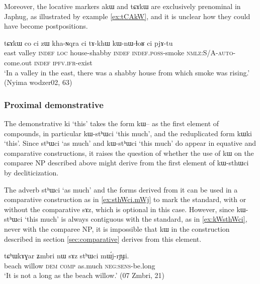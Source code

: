 \documentclass[oldfontcommands,oneside,a4paper,11pt]{article}
\newcommand{\ipa}[1]{{\phon #1}} %
\begin{document}
Moreover, the  locative markers \ipa{akɯ} and  \ipa{tɕɤkɯ} are exclusively prenominal in Japhug, as illustrated by example \ref{ex:tCAkW}, and it is unclear how they could have become postpositions.


\begin{exe}
\ex \label{ex:tCAkW}
\gll 
\ipa{tɕɤkɯ}  	\ipa{co}  	\ipa{ci}  	\ipa{zɯ}  	\ipa{kha-ɴqra}  	\ipa{ci}  	\ipa{tɤ-khɯ}  	\ipa{kɯ-nɯ-ɬoʁ}  	\ipa{ci}  	\ipa{pjɤ-tu}  \\
east valley \textsc{indef} \textsc{loc} house-shabby \textsc{indef} \textsc{indef.poss}-smoke \textsc{nmlz:S/A-auto}-come.out  \textsc{indef}  \textsc{ipfv.ifr}-exist \\
\glt `In a valley in the east, there was a shabby house from which smoke was rising.'  (Nyima wodzer02, 63)
\end{exe}

\subsubsection{Proximal demonstrative}
The demonstrative \ipa{ki} `this' takes the form \ipa{kɯ--} as the first element of compounds, in particular \ipa{kɯ-stʰɯci} `this much',  and the reduplicated form \ipa{kɯki} `this'.  Since \ipa{stʰɯci} `as much' and \ipa{kɯ-stʰɯci} `this much' do appear in equative and comparative constructions, it raises the question of whether the use of \ipa{kɯ} on the comparee NP described above might derive from the first element of \ipa{kɯ-sthɯci} by decliticization.

The adverb \ipa{stʰɯci} `as much' and the forms derived from it can be used in a comparative construction as in \ref{ex:sthWci.mWj} to mark the standard, with or without the comparative \ipa{sɤz}, which is optional in this case. However, since  \ipa{kɯ-stʰɯci} `this much' is always contiguous with the standard, as in \ref{ex:kWsthWci}, never with the comparee NP, it is impossible that \ipa{kɯ} in the construction described in section \ref{sec:comparative} derives from this element.
 
 
  \begin{exe}
\ex \label{ex:sthWci.mWj}
\gll 
 \ipa{tɕʰɯkɤɣar}  	\ipa{ʑmbri}  	\ipa{nɯ}  	\ipa{sɤz}  	\ipa{stʰɯci}  	\ipa{mɯ́j-rɲɟi.}  \\
beach willow \textsc{dem} \textsc{comp} as.much \textsc{neg:sens}-be.long \\
\glt `It is not a long as the beach willow.' (07 Zmbri, 21)
  \end{exe}
\end{document}
